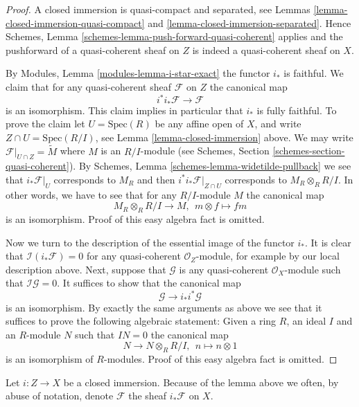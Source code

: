 \begin{proof}
A closed immersion is quasi-compact and separated, see
Lemmas \ref{lemma-closed-immersion-quasi-compact} and
\ref{lemma-closed-immersion-separated}. Hence
Schemes, Lemma \ref{schemes-lemma-push-forward-quasi-coherent}
applies and the pushforward of a quasi-coherent
sheaf on $Z$ is indeed a quasi-coherent sheaf on $X$.

\medskip\noindent
By Modules, Lemma \ref{modules-lemma-i-star-exact}
the functor $i_*$ is faithful. We claim that
for any quasi-coherent sheaf $\mathcal{F}$ on $Z$
the canonical map
$$
i^*i_*\mathcal{F} \longrightarrow \mathcal{F}
$$
is an isomorphism. This claim implies in particular that $i_*$ is
fully faithful. To prove the claim let $U = \text{Spec}(R)$ be any affine open
of $X$, and write $Z \cap U = \text{Spec}(R/I)$, see
Lemma \ref{lemma-closed-immersion} above. We may write
$\mathcal{F}|_{U \cap Z} = \widetilde{M}$ where
$M$ is an $R/I$-module (see
Schemes, Section \ref{schemes-section-quasi-coherent}).
By Schemes, Lemma \ref{schemes-lemma-widetilde-pullback}
we see that $i_*\mathcal{F}|_U$ corresponds to
$M_R$ and then $i^*i_*\mathcal{F}|_{Z \cap U}$ corresponds
to $M_R \otimes_R R/I$. In other words, we have to see that
for any $R/I$-module $M$ the canonical map
$$
M_R \otimes_R R/I \longrightarrow M, \ \ 
m \otimes f \longmapsto fm
$$
is an isomorphism. Proof of this easy algebra fact is omitted.

\medskip\noindent
Now we turn to the description of the essential image of the
functor $i_*$. It is clear that $\mathcal{I}(i_*\mathcal{F}) = 0$
for any quasi-coherent $\mathcal{O}_Z$-module, for example
by our local description above. Next, suppose that $\mathcal{G}$
is any quasi-coherent $\mathcal{O}_X$-module such that
$\mathcal{I}\mathcal{G} = 0$. It suffices to show that the canonical map
$$
\mathcal{G} \longrightarrow i_* i^*\mathcal{G}
$$
is an isomorphism. By exactly the same arguments as above we see that
it suffices to prove the following algebraic statement: Given a ring
$R$, an ideal $I$ and an $R$-module $N$ such that $IN = 0$ the canonical map
$$
N \longrightarrow N \otimes_R R/I, \ \ 
n \longmapsto n \otimes 1
$$
is an isomorphism of $R$-modules. Proof of this easy algebra fact is omitted.
\end{proof}

\noindent
Let $i : Z \to X$ be a closed immersion. Because of the lemma above we often,
by abuse of notation, denote $\mathcal{F}$ the sheaf $i_*\mathcal{F}$ on $X$.

